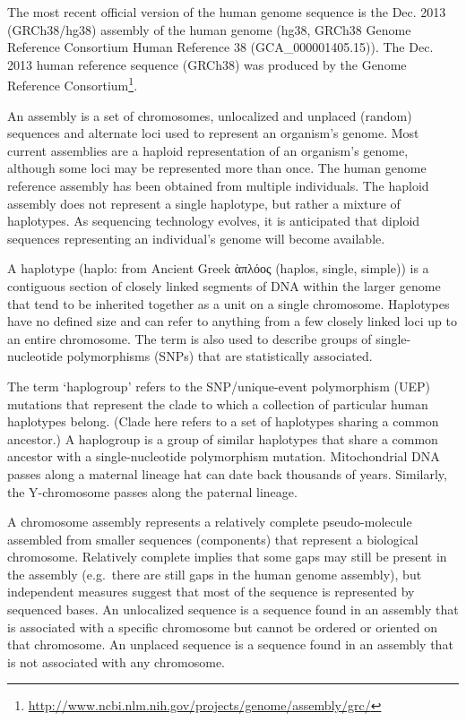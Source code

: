 \documentclass[]{book}
\let\rmarkdownfootnote\footnote%
\def\footnote{\protect\rmarkdownfootnote}
\renewcommand{\href}[2]{#2\footnote{\url{#1}}}
\theoremstyle{definition}
\theoremstyle{definition}
\theoremstyle{definition}
\theoremstyle{remark}
\begin{document}
The most recent official version of the human genome sequence is the
Dec. 2013 (GRCh38/hg38) assembly of the human genome (hg38, GRCh38
Genome Reference Consortium Human Reference 38 (GCA\_000001405.15)). The
Dec. 2013 human reference sequence (GRCh38) was produced by the
\href{http://www.ncbi.nlm.nih.gov/projects/genome/assembly/grc/}{Genome
Reference Consortium}.

An assembly is a set of chromosomes, unlocalized and unplaced (random)
sequences and alternate loci used to represent an organism's genome.
Most current assemblies are a haploid representation of an organism's
genome, although some loci may be represented more than once. The human
genome reference assembly has been obtained from multiple individuals.
The haploid assembly does not represent a single haplotype, but rather a
mixture of haplotypes. As sequencing technology evolves, it is
anticipated that diploid sequences representing an individual's genome
will become available.

A haplotype (haplo: from Ancient Greek ὰπλόος (haplos, single, simple))
is a contiguous section of closely linked segments of DNA within the
larger genome that tend to be inherited together as a unit on a single
chromosome. Haplotypes have no defined size and can refer to anything
from a few closely linked loci up to an entire chromosome. The term is
also used to describe groups of single-nucleotide polymorphisms (SNPs)
that are statistically associated.

The term `haplogroup' refers to the SNP/unique-event polymorphism (UEP)
mutations that represent the clade to which a collection of particular
human haplotypes belong. (Clade here refers to a set of haplotypes
sharing a common ancestor.) A haplogroup is a group of similar
haplotypes that share a common ancestor with a single-nucleotide
polymorphism mutation. Mitochondrial DNA passes along a maternal lineage
hat can date back thousands of years. Similarly, the Y-chromosome passes
along the paternal lineage.

A chromosome assembly represents a relatively complete pseudo-molecule
assembled from smaller sequences (components) that represent a
biological chromosome. Relatively complete implies that some gaps may
still be present in the assembly (e.g.~there are still gaps in the human
genome assembly), but independent measures suggest that most of the
sequence is represented by sequenced bases. An unlocalized sequence is a
sequence found in an assembly that is associated with a specific
chromosome but cannot be ordered or oriented on that chromosome. An
unplaced sequence is a sequence found in an assembly that is not
associated with any chromosome.
\end{document}
